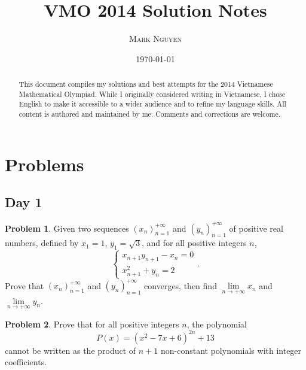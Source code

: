 \documentclass[11pt]{article}
\title{\textbf{\Huge VMO 2014 Solution Notes}}
\author{\LARGE \textsc{Mark Nguyen}}
\date{\sffamily\today}
\theoremstyle{definition}
\newtheorem{exercise}{Problem}
\newcommand{\boom}{\vspace{0.25cm}}
\begin{document}
\maketitle

\begin{abstract}
    This document compiles my solutions and best attempts for the 2014 Vietnamese Mathematical Olympiad. While I originally considered writing in Vietnamese, I chose English to make it accessible to a wider audience and to refine my language skills. All content is authored and maintained by me. Comments and corrections are welcome.
\end{abstract}

\tableofcontents

\newpage

\section{Problems}

    \subsection*{Day 1}

        \begin{exercise}
            Given two sequences \((x_n)_{n=1}^{+\infty}\) and \((y_n)_{n=1}^{+\infty}\) of positive real numbers, defined by \(x_1 = 1\), \(y_1 = \sqrt{3}\), and for all positive integers \(n\),
            \[\begin{cases}
                x_{n+1}y_{n+1} - x_n = 0 \\
                x_{n+1}^2 + y_n = 2
            \end{cases}.\]
            Prove that \((x_n)_{n=1}^{+\infty}\) and \((y_n)_{n=1}^{+\infty}\) converges, then find \(\lim\limits_{n \to +\infty} x_n\) and \(\lim\limits_{n \to +\infty} y_n\).
        \end{exercise}
    
        \boom
    
        \begin{exercise}
            Prove that for all positive integers \(n\), the polynomial
            \[P(x) = (x^2 - 7x + 6)^{2n} + 13\]
            cannot be written as the product of \(n + 1\) non-constant polynomials with integer coefficients.
        \end{exercise}
    
        \boom
    
\end{document}
